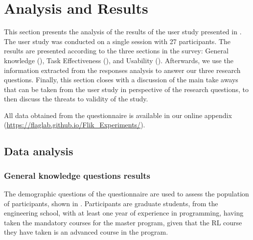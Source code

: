 
\section{Analysis and Results}
\label{sec:results}

This section presents the analysis of the results of the user study presented in 
. The user study was conducted on a single session with 27 participants.
The results are presented according to the three sections in the survey: General 
knowledge (), Task Effectiveness (), and Usability 
(). Afterwards, we use the information extracted from the responses analysis to 
answer our three research questions. Finally, this section closes with a discussion of the main take 
aways that can be taken from the user study in perspective of the research questions, to then discuss 
the threats to validity of the study. 

All data obtained from the questionnaire is available in our 
online appendix (\url{https://flaglab.github.io/Flik_Experiments/}).


\subsection{Data analysis}
\label{sec:analysis}

\subsubsection{General knowledge questions results}
\label{sec:general-knowledge}

The demographic questions of the questionnaire are used to assess the population of participants, 
shown in . Participants are graduate students, from the engineering school, 
with at least one year of experience in programming, having taken the mandatory courses for the 
master program, given that the \ac{RL} course they have taken is an advanced course in the program. 

